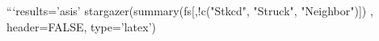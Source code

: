 \documentclass{article}
\begin{document}


```{results='asis'}
stargazer(summary(fs[,!c("Stkcd", "Struck", "Neighbor")])
,  header=FALSE, type='latex')
\end{document}
